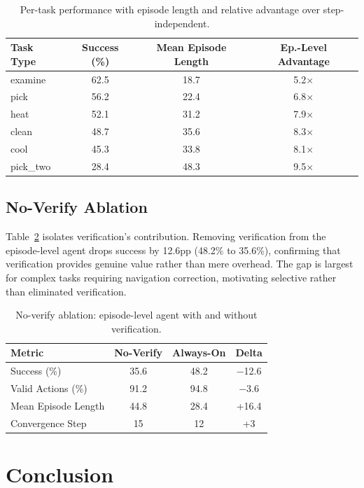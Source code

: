 \documentclass[11pt]{article}
\begin{document}
\begin{table}[h]
\centering
\caption{Per-task performance with episode length and relative advantage over step-independent.}
\label{tab:per_task_detail}
\begin{tabular}{lccc}
\toprule
Task Type & Success (\%) & Mean Episode Length & Ep.-Level Advantage \\
\midrule
examine & 62.5 & 18.7 & 5.2$\times$ \\
pick & 56.2 & 22.4 & 6.8$\times$ \\
heat & 52.1 & 31.2 & 7.9$\times$ \\
clean & 48.7 & 35.6 & 8.3$\times$ \\
cool & 45.3 & 33.8 & 8.1$\times$ \\
pick\_two & 28.4 & 48.3 & 9.5$\times$ \\
\bottomrule
\end{tabular}
\end{table}

\subsection{No-Verify Ablation}

Table~\ref{tab:no_verify} isolates verification's contribution. Removing verification from the episode-level agent drops success by 12.6pp (48.2\% to 35.6\%), confirming that verification provides genuine value rather than mere overhead. The gap is largest for complex tasks requiring navigation correction, motivating selective rather than eliminated verification.

\begin{table}[h]
\centering
\caption{No-verify ablation: episode-level agent with and without verification.}
\label{tab:no_verify}
\begin{tabular}{lccc}
\toprule
Metric & No-Verify & Always-On & Delta \\
\midrule
Success (\%) & 35.6 & 48.2 & $-$12.6 \\
Valid Actions (\%) & 91.2 & 94.8 & $-$3.6 \\
Mean Episode Length & 44.8 & 28.4 & +16.4 \\
Convergence Step & 15 & 12 & +3 \\
\bottomrule
\end{tabular}
\end{table}

\section{Conclusion}
\end{document}
